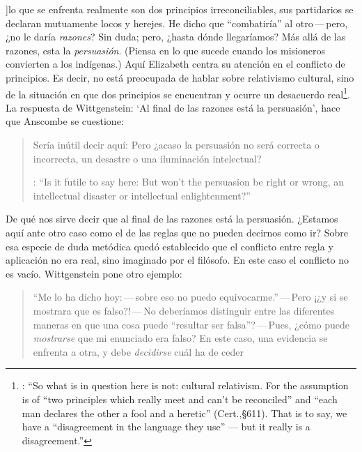 ]{lo que se enfrenta realmente son dos principios irreconciliables, sus partidarios se declaran mutuamente locos y herejes. He dicho que ``combatiría'' al otro\,---\,pero, ¿no le daría \emph{razones}? Sin duda; pero, ¿hasta dónde llegaríamos? Más allá de las razones, esta la \emph{persuasión}. (Piensa en lo que sucede cuando los misioneros convierten a los indígenas.)} Aquí Elizabeth centra su atención en el conflicto de principios. Es decir, no está preocupada de hablar sobre relativismo cultural, sino de la situación en que dos principios se encuentran y ocurre un desacuerdo real\footnote{\cite[Cf.~][131]{anscombe1981parmenides:qli}: \enquote{So what is in question here is not: cultural relativism. For the assumption is of ``two principles which really meet and can't be reconciled'' and ``each man declares the other a fool and a heretic'' (Cert.,\S611). That is to say, we have a ``disagreement in the language they use'' --- but it really is a disagreement.}}. La respuesta de Wittgenstein: \enquote*{Al final de las razones está la persuasión}, hace que Anscombe se cuestione: \blockquote[{\cite{anscombe1981parmenides:qli}}: \enquote{Is it futile to say here: But won't the persuasion be right or wrong, an intellectual disaster or intellectual enlightenment?}]{Sería inútil decir aquí: Pero ¿acaso la persuasión no será correcta o incorrecta, un desastre o una iluminación intelectual?} De qué nos sirve decir que al final de las razones está la persuasión. ¿Estamos aquí ante otro caso como el de las reglas que no pueden decirnos como ir? Sobre esa especie de duda metódica quedó establecido que el conflicto entre regla y aplicación no era real, sino imaginado por el filósofo. En este caso el conflicto no es vacío. Wittgenstein pone otro ejemplo: \blockquote[{\cite[\S641]{wittgenstein1969oncertes}}
]{``Me lo ha dicho hoy:\,---\,sobre eso no puedo equivocarme.''\,---\,Pero ¡¿y si se mostrara que es falso?!\,---\,No deberíamos distinguir entre las diferentes maneras en que una cosa puede ``resultar ser falsa''?\,---\,Pues, ¿cómo puede \emph{mostrarse} que mi enunciado era falso? En este caso, una evidencia se enfrenta a otra, y debe \emph{decidirse} cuál ha de ceder}.

